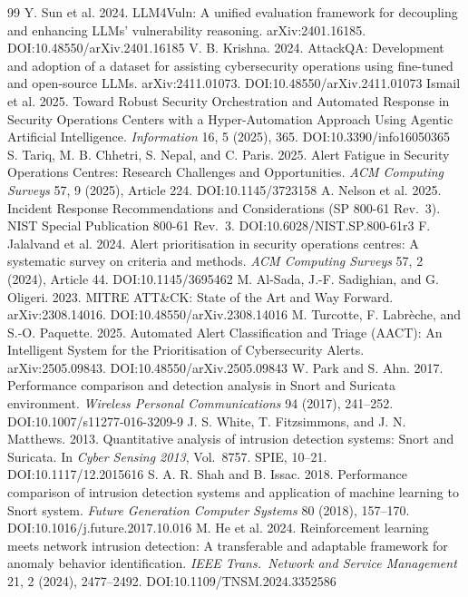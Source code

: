 \documentclass[sigconf,authordraft]{acmart}
\begin{document}
\begin{thebibliography}{99}
 Y. Sun et al. 2024. LLM4Vuln: A unified evaluation framework for decoupling and enhancing LLMs' vulnerability reasoning. arXiv:2401.16185. DOI:10.48550/arXiv.2401.16185
 V. B. Krishna. 2024. AttackQA: Development and adoption of a dataset for assisting cybersecurity operations using fine-tuned and open-source LLMs. arXiv:2411.01073. DOI:10.48550/arXiv.2411.01073
 Ismail et al. 2025. Toward Robust Security Orchestration and Automated Response in Security Operations Centers with a Hyper-Automation Approach Using Agentic Artificial Intelligence. \textit{Information} 16, 5 (2025), 365. DOI:10.3390/info16050365
 S. Tariq, M. B. Chhetri, S. Nepal, and C. Paris. 2025. Alert Fatigue in Security Operations Centres: Research Challenges and Opportunities. \textit{ACM Computing Surveys} 57, 9 (2025), Article 224. DOI:10.1145/3723158
 A. Nelson et al. 2025. Incident Response Recommendations and Considerations (SP 800-61 Rev.\ 3). NIST Special Publication 800-61 Rev.\ 3. DOI:10.6028/NIST.SP.800-61r3
 F. Jalalvand et al. 2024. Alert prioritisation in security operations centres: A systematic survey on criteria and methods. \textit{ACM Computing Surveys} 57, 2 (2024), Article 44. DOI:10.1145/3695462
 M. Al-Sada, J.-F. Sadighian, and G. Oligeri. 2023. MITRE ATT\&CK: State of the Art and Way Forward. arXiv:2308.14016. DOI:10.48550/arXiv.2308.14016
 M. Turcotte, F. Labrèche, and S.-O. Paquette. 2025. Automated Alert Classification and Triage (AACT): An Intelligent System for the Prioritisation of Cybersecurity Alerts. arXiv:2505.09843. DOI:10.48550/arXiv.2505.09843
 W. Park and S. Ahn. 2017. Performance comparison and detection analysis in Snort and Suricata environment. \textit{Wireless Personal Communications} 94 (2017), 241--252. DOI:10.1007/s11277-016-3209-9
 J. S. White, T. Fitzsimmons, and J. N. Matthews. 2013. Quantitative analysis of intrusion detection systems: Snort and Suricata. In \textit{Cyber Sensing 2013}, Vol.\ 8757. SPIE, 10--21. DOI:10.1117/12.2015616
 S. A. R. Shah and B. Issac. 2018. Performance comparison of intrusion detection systems and application of machine learning to Snort system. \textit{Future Generation Computer Systems} 80 (2018), 157--170. DOI:10.1016/j.future.2017.10.016
 M. He et al. 2024. Reinforcement learning meets network intrusion detection: A transferable and adaptable framework for anomaly behavior identification. \textit{IEEE Trans.\ Network and Service Management} 21, 2 (2024), 2477--2492. DOI:10.1109/TNSM.2024.3352586

\end{thebibliography}
\end{document}
